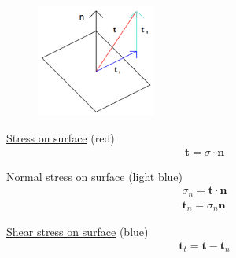 \documentclass[11pt,a4paper,english]{article}
\begin{document}
\begin{figure}
\centering
\includegraphics[width=0.35\textwidth]{figures/stressplane.png}
\end{figure}

\underline{Stress on surface} (red)
\begin{align*}
\mathbf{t} =\sigma \cdot \mathbf{n}
\end{align*}

\underline{Normal stress on surface} (light blue)
\begin{align*}
\sigma_{n} =\mathbf{t} \cdot \mathbf{n} \\ 
\mathbf{t}_n = \sigma_{n} \mathbf{n}
\end{align*}

\underline{Shear stress on surface} (blue)
\begin{align*}
\mathbf{t}_t = \mathbf{t} - \mathbf{t}_n 
\end{align*}


%
%
%
\end{document}
